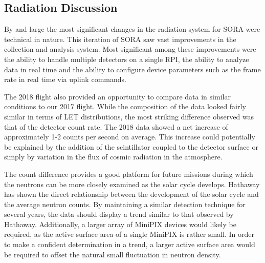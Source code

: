 \subsection{Radiation Discussion}
\label{sec:Radiation Results Discussion}
By and large the most significant changes in the radiation system for SORA were technical in nature. This iteration of SORA saw vast improvements in the collection and analysis system. Most significant among these improvements were the ability to handle multiple detectors on a single RPI, the ability to analyze data in real time and the ability to configure device parameters such as the frame rate in real time via uplink commands.

The 2018 flight also provided an opportunity to compare data in similar conditions to our 2017 flight. While the composition of the data looked fairly similar in terms of LET distributions, the most striking difference observed was that of the detector count rate. The 2018 data showed a net increase of approximately 1-2 counts per second on average. This increase could potentially be explained by the addition of the scintillator coupled to the detector surface or simply by variation in the flux of cosmic radiation in the atmosphere.

The count difference provides a good platform for future missions during which the neutrons can be more closely examined as the solar cycle develops. Hathaway \cite{SolarCycle} has shown the direct relationship between the development of the solar cycle and the average neutron counts. By maintaining a similar detection technique for several years, the data should display a trend similar to that observed by Hathaway. Additionally, a larger array of MiniPIX devices would likely be required, as the active surface area of a single MiniPIX is rather small. In order to make a confident determination in a trend, a larger active surface area would be required to offset the natural small fluctuation in neutron density.
